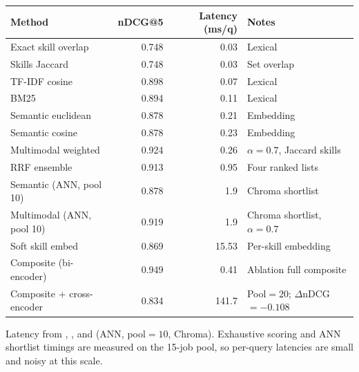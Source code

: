 \caption{Quality--latency trade-off (exhaustive evaluation, $K{=}5$).}
\label{tab:latency}
\begin{tabular}{@{}lrrl@{}}
\toprule
Method & nDCG@5 & Latency (ms/q) & Notes \\
\midrule
Exact skill overlap & 0.748 & 0.03 & Lexical \\
Skills Jaccard & 0.748 & 0.03 & Set overlap \\
TF-IDF cosine & 0.898 & 0.07 & Lexical \\
BM25 & 0.894 & 0.11 & Lexical \\
Semantic euclidean & 0.878 & 0.21 & Embedding \\
Semantic cosine & 0.878 & 0.23 & Embedding \\
Multimodal weighted & 0.924 & 0.26 & $\alpha{=}0.7$, Jaccard skills \\
RRF ensemble & 0.913 & 0.95 & Four ranked lists \\
Semantic (ANN, pool 10) & 0.878 & 1.9 & Chroma shortlist \\
Multimodal (ANN, pool 10) & 0.919 & 1.9 & Chroma shortlist, $\alpha{=}0.7$ \\
Soft skill embed & 0.869 & 15.53 & Per-skill embedding \\
Composite (bi-encoder) & 0.949 & 0.41 & Ablation full composite \\
Composite + cross-encoder & 0.834 & 141.7 & Pool${=}20$; $\Delta$nDCG${=}{-}0.108$ \\
\bottomrule
\end{tabular}
\par\vspace{0.4em}
\footnotesize{Latency from , , and  (ANN, pool${=}10$, Chroma). Exhaustive scoring and ANN shortlist timings are measured on the 15-job pool, so per-query latencies are small and noisy at this scale.}
